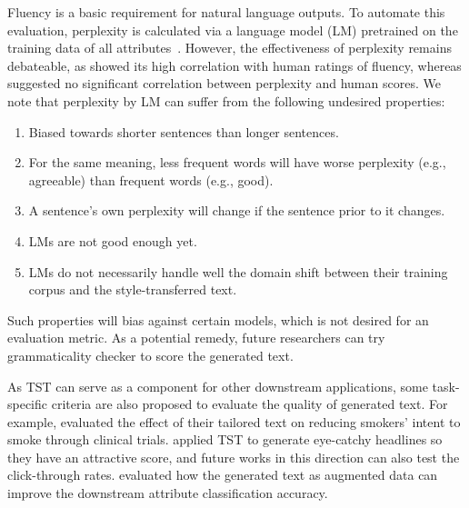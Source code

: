 Fluency is a basic requirement for natural language outputs. To automate this evaluation, perplexity is calculated via a language model (LM) pretrained on the training data of all attributes~. However, the effectiveness of perplexity remains debateable, as  showed its high correlation with human ratings of fluency, whereas  suggested no significant
correlation between perplexity and human scores. We note that perplexity by LM can suffer from the following undesired properties:
\begin{enumerate}
    \item Biased towards shorter sentences than longer sentences.
    \item For the same meaning, less frequent words will have worse perplexity (e.g., agreeable) than frequent words (e.g., good).
    \item A sentence's own perplexity will change if the sentence prior to it changes. 
    \item LMs are not good enough yet.
    \item LMs do not necessarily handle well the domain shift between their training corpus and the style-transferred text.
\end{enumerate}
Such properties will bias against certain models, which is not desired for an evaluation metric. 
As a potential remedy, future researchers can try grammaticality checker to score the generated text.

As TST can serve as a component for other downstream applications, some task-specific criteria are also proposed to evaluate the quality of generated text. For example,  evaluated the effect of their tailored text on reducing smokers' intent to smoke through clinical trials.  applied TST to generate eye-catchy headlines so they have an attractive score, and future works in this direction can also test the click-through rates.  evaluated how the generated text as augmented data can improve the downstream attribute classification accuracy.

